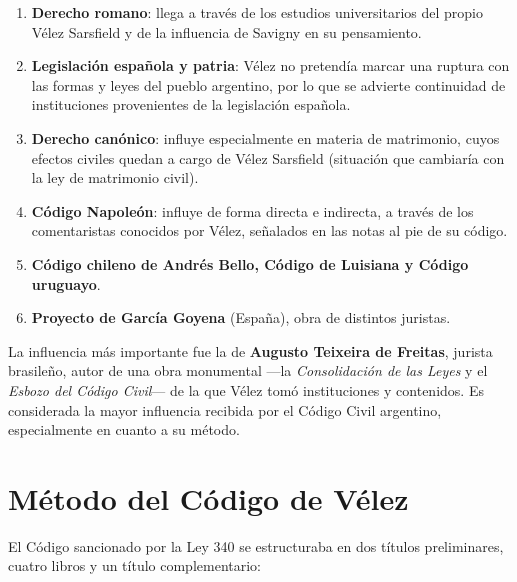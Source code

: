 \documentclass[12pt,oneside]{book}
\begin{document}
\begin{enumerate}[label=\alph*)]
\item \textbf{Derecho romano}: llega a través de los estudios universitarios del propio Vélez Sarsfield y de la influencia de Savigny en su pensamiento.
\item \textbf{Legislación española y patria}: Vélez no pretendía marcar una ruptura con las formas y leyes del pueblo argentino, por lo que se advierte continuidad de instituciones provenientes de la legislación española.
\item \textbf{Derecho canónico}: influye especialmente en materia de matrimonio, cuyos efectos civiles quedan a cargo de Vélez Sarsfield (situación que cambiaría con la ley de matrimonio civil).
\item \textbf{Código Napoleón}: influye de forma directa e indirecta, a través de los comentaristas conocidos por Vélez, señalados en las notas al pie de su código.
\item \textbf{Código chileno de Andrés Bello, Código de Luisiana y Código uruguayo}.
\item \textbf{Proyecto de García Goyena} (España), obra de distintos juristas.
\end{enumerate}

\begin{importante}
La influencia más importante fue la de \textbf{Augusto Teixeira de Freitas}, jurista brasileño, autor de una obra monumental ---la \textit{Consolidación de las Leyes} y el \textit{Esbozo del Código Civil}--- de la que Vélez tomó instituciones y contenidos. Es considerada la mayor influencia recibida por el Código Civil argentino, especialmente en cuanto a su método.
\end{importante}

\section{Método del Código de Vélez}

El Código sancionado por la Ley 340 se estructuraba en dos títulos preliminares, cuatro libros y un título complementario:
\end{document}
